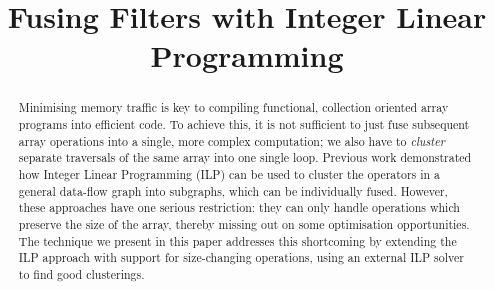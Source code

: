 \documentclass[preprint]{sigplanconf}
\begin{document}
\title{Fusing Filters with Integer Linear Programming}


\maketitle
\makeatactive

\begin{abstract}
Minimising memory traffic is key to compiling functional, collection oriented array programs into efficient code. To achieve this, it is not sufficient to just fuse subsequent array operations into a single, more complex computation; we also have to \emph{cluster} separate traversals of the same array into one single loop. Previous work demonstrated how Integer Linear Programming (ILP) can be used to cluster the operators in a general data-flow graph into subgraphs, which can be individually fused. However, these approaches have one serious restriction: they can only handle operations which preserve the size of the array, thereby missing out on some optimisation opportunities. The technique we present in this paper addresses this shortcoming by extending the ILP approach with support for size-changing operations, using an external ILP solver to find good clusterings.

\end{abstract}
\end{document}
